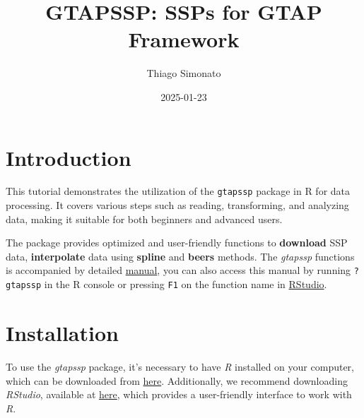 \documentclass[
  letterpaper,
  DIV=11,
  numbers=noendperiod]{scrartcl}
\title{GTAPSSP: SSPs for GTAP Framework}
\author{Thiago Simonato}
\date{2025-01-23}
\renewcommand*\contentsname{Table of contents}
\newcommand\contentsname{Table of contents}
\begin{document}
\maketitle

\renewcommand*\contentsname{Table of contents}
{
\hypersetup{linkcolor=}
\setcounter{tocdepth}{6}
\tableofcontents
}

\section{Introduction}\label{introduction}

This tutorial demonstrates the utilization of the \texttt{gtapssp}
package in R for data processing. It covers various steps such as
reading, transforming, and analyzing data, making it suitable for both
beginners and advanced users.

The package provides optimized and user-friendly functions to
\textbf{download} SSP data, \textbf{interpolate} data using
\textbf{spline} and \textbf{beers} methods. The \emph{gtapssp} functions
is accompanied by detailed
\href{https://github.com/tsimonato/gtapssp/raw/master/docs/gtapssp_0.0.0.9000.pdf}{manual},
you can also access this manual by running \texttt{?gtapssp} in the R
console or pressing \texttt{F1} on the function name in
\href{https://posit.co/download/rstudio-desktop/}{RStudio}.

\section{Installation}\label{installation}

To use the \emph{gtapssp} package, it's necessary to have \emph{R}
installed on your computer, which can be downloaded from
\href{https://www.r-project.org/}{here}. Additionally, we recommend
downloading \emph{RStudio}, available at
\href{https://posit.co/download/rstudio-desktop/}{here}, which provides
a user-friendly interface to work with \emph{R}.
\end{document}
